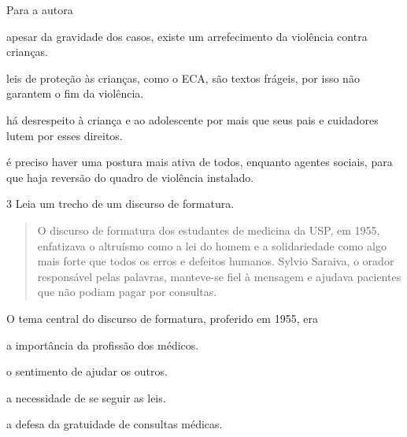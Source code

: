 Para a autora

\begin{escolha}
\item apesar da gravidade dos casos, existe um arrefecimento da violência
contra crianças.

\item leis de proteção às crianças, como o ECA, são textos frágeis, por
isso não garantem o fim da violência.

\item há desrespeito à criança e ao adolescente por mais que seus pais e
cuidadores lutem por esses direitos.

\item é preciso haver uma postura mais ativa de todos, enquanto agentes
sociais, para que haja reversão do quadro de violência instalado.
\end{escolha}

\num{3} Leia um trecho de um discurso de formatura.

\begin{quote}
O discurso de formatura dos estudantes de medicina da USP, em 1955,
enfatizava o altruísmo como a lei do homem e a solidariedade como algo
mais forte que todos os erros e defeitos humanos. Sylvio Saraiva, o
orador responsável pelas palavras, manteve-se fiel à mensagem e ajudava
pacientes que não podiam pagar por consultas.

\end{quote}

O tema central do discurso de formatura, proferido em 1955, era


\begin{escolha}
\item a importância da profissão dos médicos.

\item o sentimento de ajudar os outros.

\item a necessidade de se seguir as leis.

\item a defesa da gratuidade de consultas médicas.
\end{escolha}

